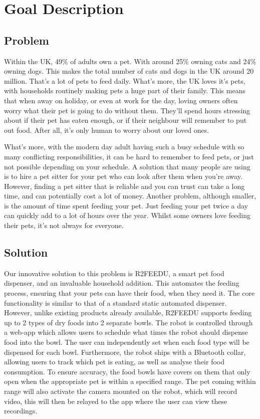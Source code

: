 \section{Goal Description}

    \subsection{Problem}
      Within the UK, 49\% of adults own a pet. With around 25\% owning cats and 24\% owning dogs. This makes the total number of cats and dogs in the UK around 20 million. That’s a lot of pets to feed daily. What’s more, the UK loves it’s pets, with households routinely making pets a huge part of their family. This means that when away on holiday, or even at work for the day, loving owners often worry what their pet is going to do without them. They’ll spend hours stressing about if their pet has eaten enough, or if their neighbour will remember to put out food. After all, it’s only human to worry about our loved ones. \par
What’s more, with the modern day adult having such a busy schedule with so many conflicting responsibilities, it can be hard to remember to feed pets, or just not possible depending on your schedule. A solution that many people are using is to hire a pet sitter for your pet who can look after them when you’re away. However, finding a pet sitter that is reliable and you can trust can take a long time, and can potentially cost a lot of money. Another problem, although smaller, is the amount of time spent feeding your pet. Just feeding your pet twice a day can quickly add to a lot of hours over the year. Whilst some owners love feeding their pets, it’s not always for everyone.

    
    \subsection{Solution}
    Our innovative solution to this problem is R2FEEDU, a smart pet food dispenser, and an invaluable household addition. This automates the feeding process, ensuring that your pets can have their food, when they need it. The core functionality is similar to that of a standard static automated dispenser. However, unlike existing products already available, R2FEEDU supports feeding up to 2 types of dry foods into 2 separate bowls. The robot is controlled through a web-app which allows users to schedule what times the robot should dispense food into the bowl. The user can independently set when each food type will be dispensed for each bowl. Furthermore, the robot ships with a Bluetooth collar, allowing users to track which pet is eating, as well as analyse their food consumption. To ensure accuracy, the food bowls have covers on them that only open when the appropriate pet is within a specified range. The pet coming within range will also activate the camera mounted on the robot, which will record video, this will then be relayed to the app where the user can view these recordings.

